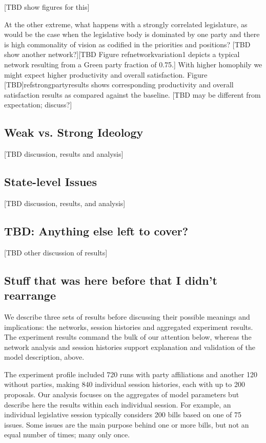 \documentclass[pdftex,12pt]{llncs}
\begin{document}
[TBD show figures for this]

At the other extreme, what happens with a strongly correlated legislature, as would be the case when the legislative body is dominated by one party and there is high commonality of vision as codified in the priorities and positions?  [TBD show another network?][TBD Figure ref{networkvariation1} depicts a typical network resulting from a Green party fraction of 0.75.]  With higher homophily we might expect higher productivity and overall satisfaction.  Figure [TBD]ref{strongpartyresults} shows corresponding productivity and overall satisfaction results as compared against the baseline. [TBD may be different from expectation; discuss?]

\subsection{Weak vs. Strong Ideology}

[TBD discussion, results and analysis]

\subsection{State-level Issues}

[TBD discussion, results, and analysis]

\subsection{TBD: Anything else left to cover?}

[TBD other discussion of results]

\subsection{Stuff that was here before that I didn't rearrange}
 
We describe three sets of results before discussing their possible meanings and implications: the networks, session histories and aggregated experiment results. 
The experiment results command the bulk of our attention below, whereas the network analysis and session histories support explanation and validation of the model description, above. 

The experiment profile included 720 runs with party affiliations and another 120 without parties, making 840 individual session histories, each with up to 200 proposals. Our analysis focuses on the aggregates of model parameters but describe here the results within each individual session. 
For example, an individual legislative session typically considers 200 bills based on one of 75 issues. 
Some issues are the main purpose behind one or more bills, but not an equal number of times; many only once. 
\end{document}
